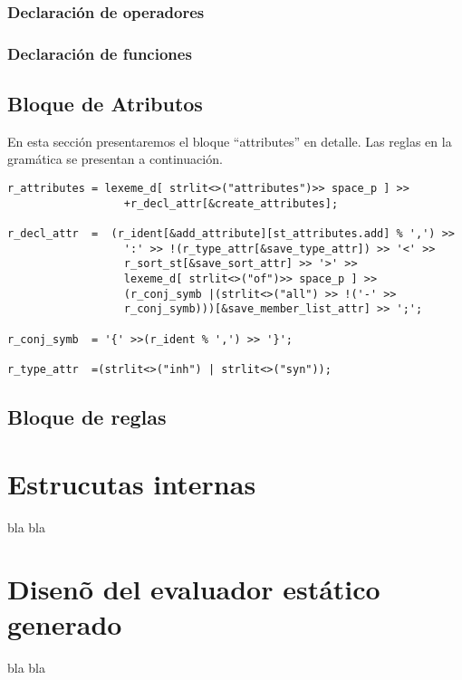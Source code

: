 \subsubsection{Declaración de operadores}
\subsubsection{Declaración de funciones}
\subsection{Bloque de Atributos}
En esta sección presentaremos el bloque ``attributes'' en detalle. Las reglas en la gramática se presentan a continuación.
\begin{table}[!htb]
\lstset{language=C++}
\scriptsize
\begin{lstlisting}[frame=single]
r_attributes = lexeme_d[ strlit<>("attributes")>> space_p ] >> 
                  +r_decl_attr[&create_attributes];

r_decl_attr  =  (r_ident[&add_attribute][st_attributes.add] % ',') >>
                  ':' >> !(r_type_attr[&save_type_attr]) >> '<' >> 
                  r_sort_st[&save_sort_attr] >> '>' >>
                  lexeme_d[ strlit<>("of")>> space_p ] >>
                  (r_conj_symb |(strlit<>("all") >> !('-' >> 
                  r_conj_symb)))[&save_member_list_attr] >> ';';

r_conj_symb  = '{' >>(r_ident % ',') >> '}';

r_type_attr  =(strlit<>("inh") | strlit<>("syn"));
\end{lstlisting}
\end{table}

\subsection{Bloque de reglas}


\section{Estrucutas internas}
bla bla

\section{Disen\~o del evaluador est\'atico generado}

bla bla